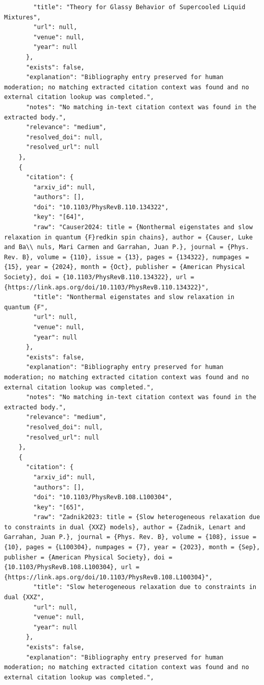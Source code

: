 \documentclass[11pt]{article}
\begin{document}
\begin{verbatim}
        "title": "Theory for Glassy Behavior of Supercooled Liquid Mixtures",
        "url": null,
        "venue": null,
        "year": null
      },
      "exists": false,
      "explanation": "Bibliography entry preserved for human moderation; no matching extracted citation context was found and no external citation lookup was completed.",
      "notes": "No matching in-text citation context was found in the extracted body.",
      "relevance": "medium",
      "resolved_doi": null,
      "resolved_url": null
    },
    {
      "citation": {
        "arxiv_id": null,
        "authors": [],
        "doi": "10.1103/PhysRevB.110.134322",
        "key": "[64]",
        "raw": "Causer2024: title = {Nonthermal eigenstates and slow relaxation in quantum {F}redkin spin chains}, author = {Causer, Luke and Ba\\ nuls, Mari Carmen and Garrahan, Juan P.}, journal = {Phys. Rev. B}, volume = {110}, issue = {13}, pages = {134322}, numpages = {15}, year = {2024}, month = {Oct}, publisher = {American Physical Society}, doi = {10.1103/PhysRevB.110.134322}, url = {https://link.aps.org/doi/10.1103/PhysRevB.110.134322}",
        "title": "Nonthermal eigenstates and slow relaxation in quantum {F",
        "url": null,
        "venue": null,
        "year": null
      },
      "exists": false,
      "explanation": "Bibliography entry preserved for human moderation; no matching extracted citation context was found and no external citation lookup was completed.",
      "notes": "No matching in-text citation context was found in the extracted body.",
      "relevance": "medium",
      "resolved_doi": null,
      "resolved_url": null
    },
    {
      "citation": {
        "arxiv_id": null,
        "authors": [],
        "doi": "10.1103/PhysRevB.108.L100304",
        "key": "[65]",
        "raw": "Zadnik2023: title = {Slow heterogeneous relaxation due to constraints in dual {XXZ} models}, author = {Zadnik, Lenart and Garrahan, Juan P.}, journal = {Phys. Rev. B}, volume = {108}, issue = {10}, pages = {L100304}, numpages = {7}, year = {2023}, month = {Sep}, publisher = {American Physical Society}, doi = {10.1103/PhysRevB.108.L100304}, url = {https://link.aps.org/doi/10.1103/PhysRevB.108.L100304}",
        "title": "Slow heterogeneous relaxation due to constraints in dual {XXZ",
        "url": null,
        "venue": null,
        "year": null
      },
      "exists": false,
      "explanation": "Bibliography entry preserved for human moderation; no matching extracted citation context was found and no external citation lookup was completed.",

\end{verbatim}
\end{document}
